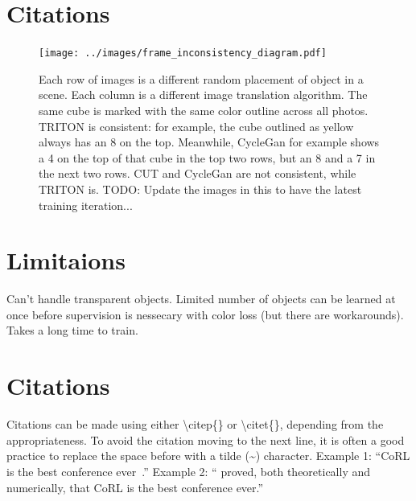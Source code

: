 \documentclass{article}
\begin{document}

\section{Citations}
\label{sec:citations}
\begin{figure}[H]
	\begin{center}
		\texttt{[image: ../images/frame\_inconsistency\_diagram.pdf]}
	\end{center}

	
	\caption{
		Each row of images is a different random placement of object in a scene.
		Each column is a different image translation algorithm.
		The same cube is marked with the same color outline across all photos.
		TRITON is consistent: for example, the cube outlined as yellow always has an 8 on the top.
		Meanwhile, CycleGan for example shows a 4 on the top of that cube in the top two rows, but an 8 and a 7 in the next two rows.
		CUT and CycleGan are not consistent, while TRITON is.
		TODO: Update the images in this to have the latest training iteration...
		}
	\label{fig:frame_inconsistency_diagram}
\end{figure}


\section{Limitaions}
\label{sec:Limitations} 

Can't handle transparent objects. 
Limited number of objects can be learned at once before supervision is nessecary with color loss (but there are workarounds).
Takes a long time to train.



\section{Citations} 
\label{sec:citations} 

Citations can be made using either \textbackslash citep\{\} or \textbackslash citet\{\}, depending from the appropriateness. To avoid the citation moving to the next line, it is often a good practice to replace the space before with a tilde (\~{}) character.
Example 1: ``CoRL is the best conference ever~\citep{Gauss1857}.''
Example 2: ``\citet{Gauss1857} proved, both theoretically and numerically, that CoRL is the best conference ever.''
\end{document}
